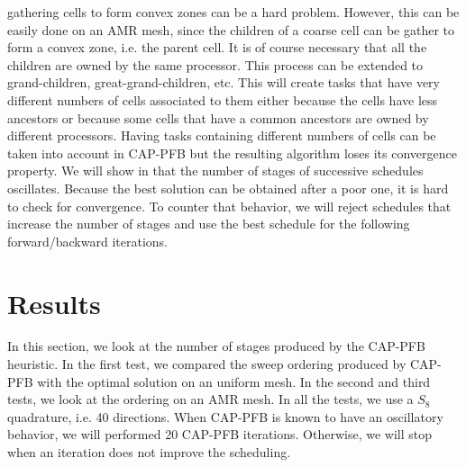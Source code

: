 \documentclass[letterpaper]{article}
\renewcommand{\(}{\left(}
\renewcommand{\)}{\right)}
\renewcommand{\[}{\left[}
\renewcommand{\]}{\right]}
\begin{document}
gathering cells to form convex zones can be a hard problem. However, this can be
easily done on an AMR mesh, since the children of a coarse cell can be gather to
form a convex zone, i.e. the parent cell. It is of course necessary that all the children are owned by
the same processor. This process can be extended to grand-children,
great-grand-children, etc. This will create tasks that have very different
numbers of cells associated to them either because the cells have less ancestors or 
because some cells that have a common ancestors are owned by
different processors. Having tasks containing different numbers of cells can be
taken into account in CAP-PFB but the resulting algorithm loses its convergence
property. We will show in  that the number of stages of successive
schedules oscillates. Because the best solution can be obtained after a poor
one, it is hard to check for convergence. To counter that behavior, we will
reject schedules that increase the number of stages and use the best schedule
for the following forward/backward iterations.


\section{Results} \label{results}
In this section, we look at the number of stages produced by the CAP-PFB heuristic. In
the first test, we compared the sweep ordering produced by CAP-PFB with the
optimal solution on an uniform mesh. In the second and third tests, we look at the ordering on an
AMR mesh. In all the tests, we use a $S_8$ quadrature, i.e. 40 directions. 
When CAP-PFB is known to have an oscillatory behavior, we will
performed 20 CAP-PFB iterations. Otherwise, we will stop when an iteration
does not improve the scheduling.
\end{document}
